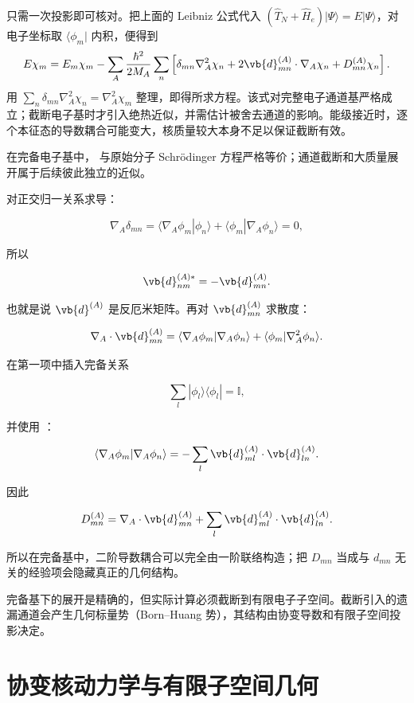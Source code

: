  只需一次投影即可核对。把上面的 Leibniz 公式代入 \((\hat T_N+\hat H_e)|\Psi\rangle=E|\Psi\rangle\)，对电子坐标取 \(\langle\phi_m|\) 内积，便得到
\[
E\chi_m=E_m\chi_m-\sum_A\frac{\hbar^2}{2M_A}
\sum_n\left[\delta_{mn}\nabla_A^2\chi_n
+2\vb{d}_{mn}^{(A)}\cdot\nabla_A\chi_n
+D_{mn}^{(A)}\chi_n\right].
\]
用 \(\sum_n\delta_{mn}\nabla_A^2\chi_n=\nabla_A^2\chi_m\) 整理，即得所求方程。该式对完整电子通道基严格成立；截断电子基时才引入绝热近似，并需估计被舍去通道的影响。能级接近时，逐个本征态的导数耦合可能变大，核质量较大本身不足以保证截断有效。

在完备电子基中， 与原始分子 Schrödinger 方程严格等价；通道截断和大质量展开属于后续彼此独立的近似。

对正交归一关系求导：

\[
\nabla_A\delta_{mn}
=\langle\nabla_A\phi_m|\phi_n\rangle
+\langle\phi_m|\nabla_A\phi_n\rangle=0,
\]

所以

\begin{equation}
\vb{d}_{nm}^{(A)*}
=-\vb{d}_{mn}^{(A)}.
\label{eq:d-antihermitian}
\end{equation}

也就是说 \(\vb{d}^{(A)}\) 是反厄米矩阵。再对 \(\vb{d}_{mn}^{(A)}\) 求散度：

\[
\nabla_A\cdot\vb{d}_{mn}^{(A)}
=\langle\nabla_A\phi_m|\nabla_A\phi_n\rangle
+\langle\phi_m|\nabla_A^2\phi_n\rangle.
\]

在第一项中插入完备关系

\[
\sum_l|\phi_l\rangle\langle\phi_l|=\mathbb I,
\]

并使用 ：

\[
\langle\nabla_A\phi_m|\nabla_A\phi_n\rangle
=-\sum_l
\vb{d}_{ml}^{(A)}\cdot\vb{d}_{ln}^{(A)}.
\]

因此

\begin{equation}
D_{mn}^{(A)}
=\nabla_A\cdot\vb{d}_{mn}^{(A)}
+\sum_l\vb{d}_{ml}^{(A)}\cdot\vb{d}_{ln}^{(A)}.
\label{eq:d-from-d}
\end{equation}

所以在完备基中，二阶导数耦合可以完全由一阶联络构造；把 \(D_{mn}\) 当成与 \(d_{mn}\) 无关的经验项会隐藏真正的几何结构。

完备基下的展开是精确的，但实际计算必须截断到有限电子子空间。截断引入的遗漏通道会产生几何标量势（Born--Huang 势），其结构由协变导数和有限子空间投影决定。

\section{协变核动力学与有限子空间几何}


